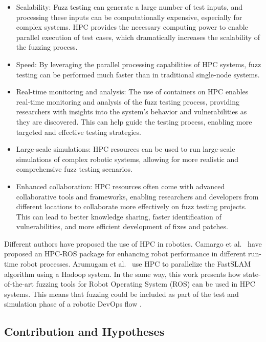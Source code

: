 \documentclass{svproc}
\begin{document}
\begin{itemize}
    \item  Scalability: Fuzz testing can generate a large number of test inputs, and processing these inputs can be computationally expensive, especially for complex systems. HPC  provides the necessary computing power to enable parallel execution of test cases, which dramatically increases the scalability of the fuzzing process.
    \item   Speed: By leveraging the parallel processing capabilities of HPC systems, fuzz testing can be performed much faster than in traditional single-node systems. 
    \item  Real-time monitoring and analysis: The use of containers on HPC enables real-time monitoring and analysis of the fuzz testing process, providing researchers with insights into the system's behavior and vulnerabilities as they are discovered. This can help guide the testing process, enabling more targeted and effective testing strategies.
    \item  Large-scale simulations: HPC resources can be used to run large-scale simulations of complex robotic systems, allowing for more realistic and comprehensive fuzz testing scenarios.
    \item  Enhanced collaboration: HPC resources often come with advanced collaborative tools and frameworks, enabling researchers and developers from different locations to collaborate more effectively on fuzz testing projects. This can lead to better knowledge sharing, faster identification of vulnerabilities, and more efficient development of fixes and patches.
\end{itemize}
  
Different authors have proposed the use of HPC in robotics. Camargo et al.~\cite{camargo2018towards} have proposed an HPC-ROS package for enhancing robot performance in different run-time robot processes. Arumugam et al.~\cite{arumugam2010davinci}  use HPC to parallelize the FastSLAM algorithm using a Hadoop system.  
In the same way, this work presents how state-of-the-art fuzzing tools for Robot Operating System (ROS) can be used in HPC systems. This means that fuzzing could be included as part of the test and simulation phase of a robotic DevOps flow \cite{mayoral2020devsecops}. 


\subsection{Contribution and Hypotheses}
\end{document}
